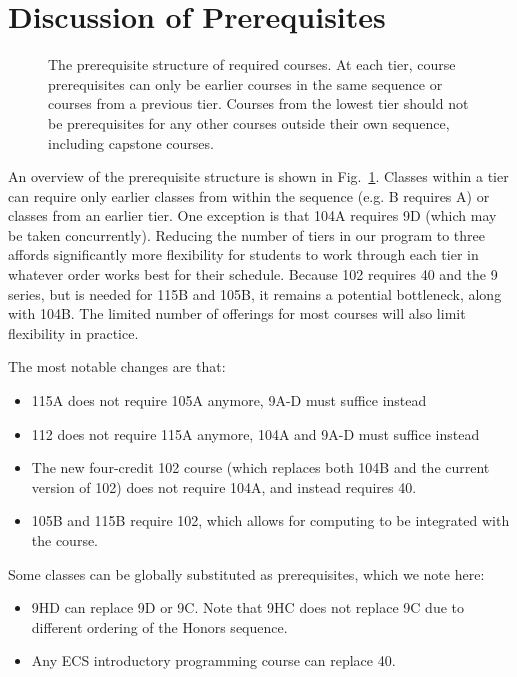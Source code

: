 \documentclass[12pt]{article}
\begin{document}
\section{Discussion of Prerequisites}

\begin{figure}
\begin{center}
\caption{\label{fig:prereqs} The prerequisite structure of required courses.  At each tier, course prerequisites can only be earlier courses in the same sequence or courses from a previous tier.  Courses from the lowest tier should not be prerequisites for any other courses outside their own sequence, including capstone courses.}
\end{center}
\end{figure}

An overview of the prerequisite structure is shown in Fig.~\ref{fig:prereqs}.  Classes within a tier can require only earlier classes from within the sequence (e.g. B requires A) or classes from an earlier tier.  One exception is that 104A requires 9D (which may be taken concurrently).  Reducing the number of tiers in our program to three affords significantly more flexibility for students to work through each tier in whatever order works best for their schedule.  Because 102 requires 40 and the 9 series, but is needed for 115B and 105B, it remains a potential bottleneck, along with 104B.  The limited number of offerings for most courses will also limit flexibility in practice.

The most notable changes are that:
\begin{itemize}
\item 115A does not require 105A anymore, 9A-D must suffice instead
\item 112 does not require 115A anymore, 104A and 9A-D must suffice instead
\item The new four-credit 102 course (which replaces both 104B and the current version of 102) does not require 104A, and instead requires 40.
\item 105B and 115B require 102, which allows for computing to be integrated with the course. 
\end{itemize}
Some classes can be globally substituted as prerequisites, which we note here:
\begin{itemize}
\item 9HD can replace 9D or 9C.  Note that 9HC does not replace 9C due to different ordering of the Honors sequence.
\item Any ECS introductory programming course can replace 40.
\end{itemize}
\end{document}
